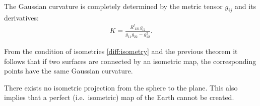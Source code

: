 

    \begin{theorem}\label{diff:theorema_egregium}
        The Gaussian curvature is completely determined by the metric tensor $g_{ij}$ and its derivatives:
        \begin{gather}
            K = \frac{R^l_{\ 121}g_{l2}}{g_{11}g_{22} - g_{12}^2}.
        \end{gather}
    \end{theorem}

    \begin{property}
        From the condition of isometries \ref{diff:isometry} and the previous theorem it follows that if two surfaces are connected by an isometric map, the corresponding points have the same Gaussian curvature.
    \end{property}
    \begin{result}
        There exists no isometric projection from the sphere to the plane. This also implies that a perfect (i.e.~isometric) map of the Earth cannot be created.
    \end{result}